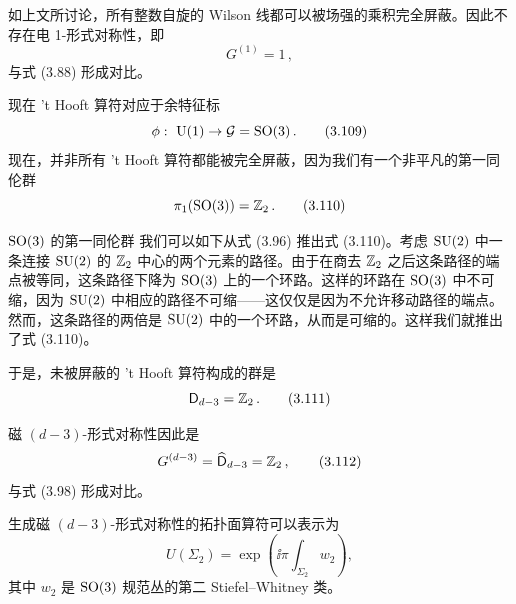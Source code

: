 

如上文所讨论，所有整数自旋的 Wilson 线都可以被场强的乘积完全屏蔽。因此不存在电 1-形式对称性，即
\begin{equation}
    G^{(1)} = 1 \,,
    \tag{3.108}
\end{equation}
与式 (3.88) 形成对比。

现在 't Hooft 算符对应于余特征标
\begin{equation}
    \phi:\ \U(1) \to \cG = \SO(3) \,.
    \tag{3.109}
\end{equation}
现在，并非所有 't Hooft 算符都能被完全屏蔽，因为我们有一个非平凡的第一同伦群
\begin{equation}
    \pi_1(\mathrm{SO}(3)) = \mathbb{Z}_2 \,.
    \tag{3.110}
\end{equation}

\begin{notebox}{$\mathrm{SO}(3)$ 的第一同伦群}
我们可以如下从式 (3.96) 推出式 (3.110)。考虑 $\mathrm{SU}(2)$ 中一条连接 $\mathrm{SU}(2)$ 的 $\mathbb{Z}_2$ 中心的两个元素的路径。由于在商去 $\mathbb{Z}_2$ 之后这条路径的端点被等同，这条路径下降为 $\mathrm{SO}(3)$ 上的一个环路。这样的环路在 $\mathrm{SO}(3)$ 中不可缩，因为 $\mathrm{SU}(2)$ 中相应的路径不可缩——这仅仅是因为不允许移动路径的端点。然而，这条路径的两倍是 $\mathrm{SU}(2)$ 中的一个环路，从而是可缩的。这样我们就推出了式 (3.110)。
\end{notebox}

于是，未被屏蔽的 't Hooft 算符构成的群是
\begin{equation}
    \mathsf{D}_{d-3} = \mathbb{Z}_2 \,.
    \tag{3.111}
\end{equation}


磁 $(d-3)$-形式对称性因此是
\begin{equation}
    G^{(d-3)} = \widehat{\mathsf{D}}_{d-3} = \mathbb{Z}_2 \,,
    \tag{3.112}
\end{equation}
与式 (3.98) 形成对比。


生成磁 $(d-3)$-形式对称性的拓扑面算符可以表示为
\begin{equation}
    U(\Sigma_2) = \exp\left(\ii\pi\int_{\Sigma_2} w_2\right) ,
    \tag{3.113}
\end{equation}
其中 $w_2$ 是 $\mathrm{SO}(3)$ 规范丛的第二 Stiefel--Whitney 类。

